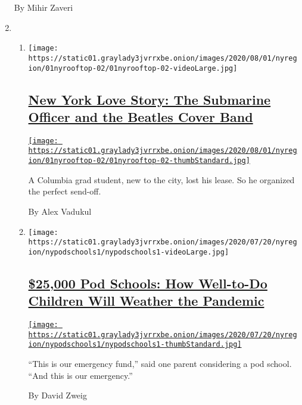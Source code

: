 \begin{enumerate}
  By Mihir Zaveri
\item
  \begin{enumerate}
  \def\labelenumii{\arabic{enumii}.}
  \item
    \texttt{[image: https://static01.graylady3jvrrxbe.onion/images/2020/08/01/nyregion/01nyrooftop-02/01nyrooftop-02-videoLarge.jpg]}

    \hypertarget{new-york-love-story-the-submarine-officer-and-the-beatles-cover-band}{%
    \subsection{\texorpdfstring{\href{/2020/07/30/nyregion/coronavirus-beatles-nyc.html}{New
    York Love Story: The Submarine Officer and the Beatles Cover
    Band}}{New York Love Story: The Submarine Officer and the Beatles Cover Band}}\label{new-york-love-story-the-submarine-officer-and-the-beatles-cover-band}}

    \href{/2020/07/30/nyregion/coronavirus-beatles-nyc.html}{\texttt{[image: https://static01.graylady3jvrrxbe.onion/images/2020/08/01/nyregion/01nyrooftop-02/01nyrooftop-02-thumbStandard.jpg]}}

    A Columbia grad student, new to the city, lost his lease. So he
    organized the perfect send-off.

    By Alex Vadukul
  \item
    \texttt{[image: https://static01.graylady3jvrrxbe.onion/images/2020/07/20/nyregion/nypodschools1/nypodschools1-videoLarge.jpg]}

    \hypertarget{25000-pod-schools-how-well-to-do-children-will-weather-the-pandemic}{%
    \subsection{\texorpdfstring{\href{/2020/07/30/nyregion/pod-schools-hastings-on-hudson.html}{\$25,000
    Pod Schools: How Well-to-Do Children Will Weather the
    Pandemic}}{\$25,000 Pod Schools: How Well-to-Do Children Will Weather the Pandemic}}\label{25000-pod-schools-how-well-to-do-children-will-weather-the-pandemic}}

    \href{/2020/07/30/nyregion/pod-schools-hastings-on-hudson.html}{\texttt{[image: https://static01.graylady3jvrrxbe.onion/images/2020/07/20/nyregion/nypodschools1/nypodschools1-thumbStandard.jpg]}}

    ``This is our emergency fund,'' said one parent considering a pod
    school. ``And this is our emergency.''

    By David Zweig
  \end{enumerate}
\end{enumerate}

